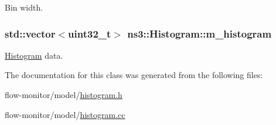 Bin width. 

\subsubsection[{\texorpdfstring{m\+\_\+histogram}{m_histogram}}]{\setlength{\rightskip}{0pt plus 5cm}std\+::vector$<$uint32\+\_\+t$>$ ns3\+::\+Histogram\+::m\+\_\+histogram\hspace{0.3cm}{\ttfamily [private]}}\hypertarget{classns3_1_1Histogram_a4e84e8b2f18d8dd6c23bc55ea8c18c4a}{}\label{classns3_1_1Histogram_a4e84e8b2f18d8dd6c23bc55ea8c18c4a}


\hyperlink{classns3_1_1Histogram}{Histogram} data. 



The documentation for this class was generated from the following files\+:\begin{DoxyCompactItemize}
\item 
flow-\/monitor/model/\hyperlink{histogram_8h}{histogram.\+h}\item 
flow-\/monitor/model/\hyperlink{histogram_8cc}{histogram.\+cc}\end{DoxyCompactItemize}

